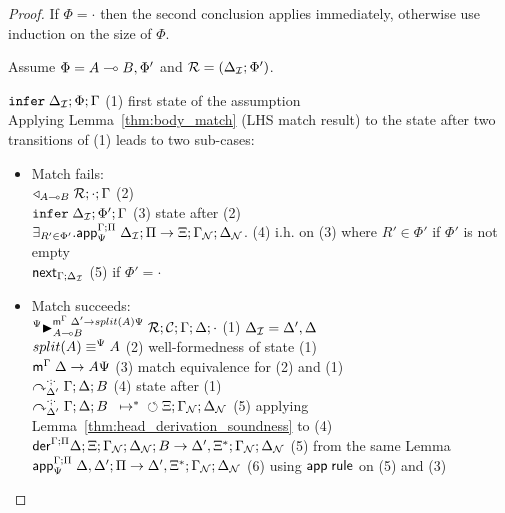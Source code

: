 \begin{proof}
If $\Phi = \cdot$ then the second conclusion applies immediately, otherwise use
induction on the size of $\Phi$.

Assume $\Phi = A \lolli B, \Phi'$ and $\rulestk = (\deltan; \Phi')$.

$\dostate{\deltan}{\Phi}{\Gamma}{\Pi}$ \hfill (1) first state of the assumption \\

Applying Lemma~\ref{thm:body_match} (LHS match result) to the state after two
transitions of (1) leads to two sub-cases:

\begin{itemize}[leftmargin=*]
   \item Match fails: \\
   $\contstate{A \lolli B}{\rulestk}{\cdot}{\Gamma}$ \hfill (2) \\
   $\dostate{\deltan}{\Phi'}{\Gamma}{\Pi}$ \hfill (3) state after (2) \\

   $\exists_{R' \in \Phi'}. \az{\Psi}{\Gamma}{\deltan}{\Pi}{R'}{\Xi; \gammanew;
   \deltanew}$. \hfill (4) i.h. on (3) where $R' \in \Phi'$ if $\Phi'$ is
   not empty \\

   $\failstate{\Gamma}{\deltan}$ \hfill (5) if $\Phi' = \cdot$ \\

   \item Match succeeds: \\

   $\matstateb{A \lolli B}{\rulestk}{\lstack{C}}{\Gamma}{\Delta}{\cdot}{\Delta'
      \rightarrow split(A)\Psi}{\Psi}$ \hfill (1) $\deltan = \Delta', \Delta$ \\

   $\feqa{split(A)}{A}{\Psi}{\Psi}$ \hfill (2) well-formedness of state (1) \\

   $\mz{\Gamma}{\Delta}{A\Psi}$ \hfill (3) match equivalence for (2) and (1) \\

   $\derstatex{\Gamma}{\Delta}{\Delta'}{\cdot}{\cdot}{B}$ \hfill (4) state
   after (1) \\

   $\transs{\derstatex{\Gamma}{\Delta}{\Delta'}{\cdot}{\cdot}{B}}{\finalstate{\Xi}{\gammanew}{\deltanew}}$
   \hfill (5) applying Lemma~\ref{thm:head_derivation_soundness} to (4) \\

   $\dz{\Gamma}{\Pi}{\Delta}{\Xi}{\gammanew}{\deltanew}{B}{\Delta', \Xi^{*}; \gammanew; \deltanew}$ \hfill (5) from the
      same Lemma \\

      $\az{\Psi}{\Gamma}{\Delta, \Delta'}{\Pi}{A \lolli B}{\Delta', \Xi^{*}; \gammanew;
      \deltanew}$ \hfill (6) using $\azname \m{rule}$ on (5) and (3) \\

\end{itemize}

\end{proof}
